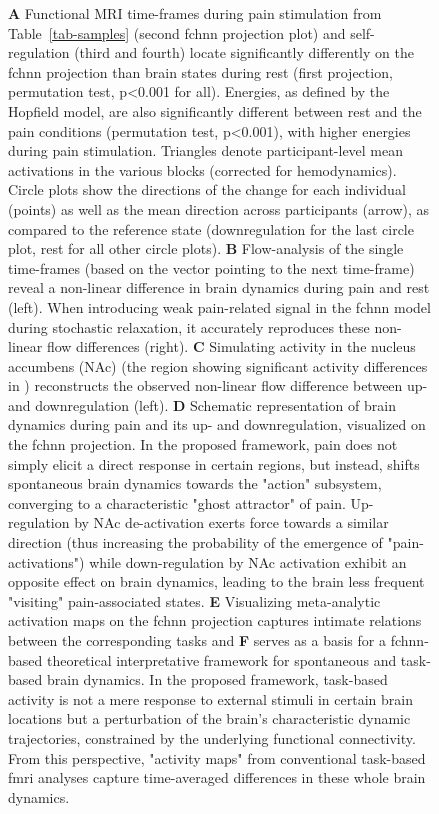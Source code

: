 \documentclass{article}
\begin{document}
\begin{figure}[!htbp]
{\textbf{A} Functional MRI time-frames during pain stimulation from Table~\ref{tab-samples} (second \acrshort{fchnn} projection plot)
and self-regulation (third and fourth) locate significantly differently on the \acrshort{fchnn} projection than brain states
during rest (first projection, permutation test, p\textless 0.001 for all).  Energies, as defined by the Hopfield model, are also
significantly different between rest and the pain conditions (permutation test, p\textless 0.001), with higher energies during
pain stimulation. Triangles denote participant-level mean activations in the various blocks (corrected for
hemodynamics). Circle plots show the directions of the change for each individual (points) as well as the mean direction
across participants (arrow), as compared to the reference state (downregulation for the last circle plot, rest for all
other circle plots).
\textbf{B} Flow-analysis of the single time-frames (based on the vector pointing to the next time-frame)
reveal a non-linear difference in brain dynamics during pain and rest (left). When introducing weak
pain-related signal in the \acrshort{fchnn} model during stochastic relaxation, it accurately reproduces these non-linear flow
differences (right).
\textbf{C} Simulating activity in the nucleus accumbens (NAc) (the region showing significant activity differences in \cite{woo2015distinct}) reconstructs the observed non-linear flow difference between up- and downregulation (left).
\textbf{D} Schematic representation of brain dynamics during pain and its up- and downregulation, visualized on the \acrshort{fchnn}
projection. In the proposed framework, pain does not simply elicit a direct response in certain regions, but instead, shifts spontaneous brain dynamics towards the "action" subsystem, converging to a characteristic "ghost
attractor" of pain. Up-regulation by NAc de-activation exerts force towards a similar direction (thus increasing the probability of the emergence of "pain-activations") while down-regulation
by NAc activation exhibit an opposite effect on brain dynamics, leading to the brain less frequent "visiting"
pain-associated states.
\textbf{E} Visualizing meta-analytic activation maps on the \acrshort{fchnn} projection captures intimate relations between the corresponding tasks and \textbf{F} serves as a basis for a \acrshort{fchnn}-based theoretical interpretative framework for spontaneous and task-based brain dynamics. In the proposed framework, task-based activity is not a mere response to external stimuli in certain brain locations but a perturbation of the brain's characteristic dynamic trajectories, constrained by the underlying functional connectivity. From this perspective, "activity maps" from conventional task-based \acrshort{fmri} analyses capture time-averaged differences in these whole brain dynamics.}
\label{task-validity}
\end{figure}
\end{document}
